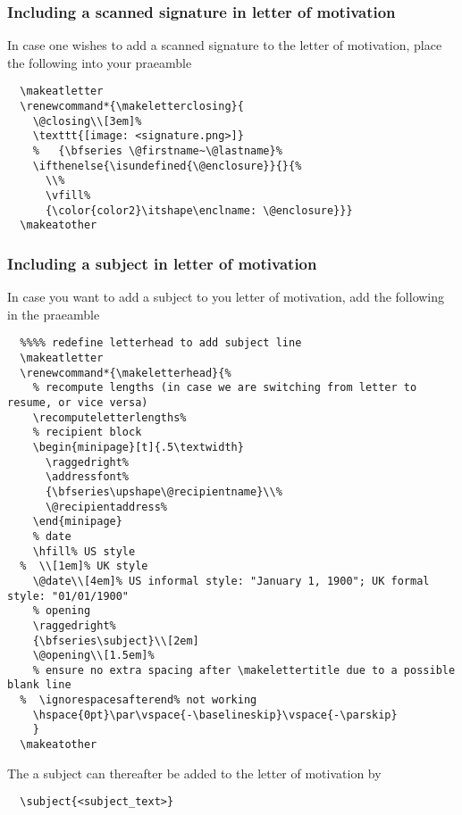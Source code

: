 \documentclass[a4paper,11pt]{article}
\begin{document}
\subsubsection{Including a scanned signature in letter of motivation}
\label{section:add:signature}
In case one wishes to add a scanned signature to the letter of motivation, place the following into your praeamble
\begin{lstlisting}
  \makeatletter
  \renewcommand*{\makeletterclosing}{
    \@closing\\[3em]%
    \texttt{[image: <signature.png>]}
    %   {\bfseries \@firstname~\@lastname}%
    \ifthenelse{\isundefined{\@enclosure}}{}{%
      \\%
      \vfill%
      {\color{color2}\itshape\enclname: \@enclosure}}}
  \makeatother
\end{lstlisting}

\subsubsection{Including a subject in letter of motivation}
\label{section:add:subject}
In case you want to add a subject to you letter of motivation, add the following in the praeamble
\begin{lstlisting}
  %%%% redefine letterhead to add subject line
  \makeatletter
  \renewcommand*{\makeletterhead}{%
    % recompute lengths (in case we are switching from letter to resume, or vice versa)
    \recomputeletterlengths%
    % recipient block
    \begin{minipage}[t]{.5\textwidth}
      \raggedright%
      \addressfont%
      {\bfseries\upshape\@recipientname}\\%
      \@recipientaddress%
    \end{minipage}
    % date
    \hfill% US style
  %  \\[1em]% UK style
    \@date\\[4em]% US informal style: "January 1, 1900"; UK formal style: "01/01/1900"
    % opening
    \raggedright%
    {\bfseries\subject}\\[2em]
    \@opening\\[1.5em]%
    % ensure no extra spacing after \makelettertitle due to a possible blank line
  %  \ignorespacesafterend% not working
    \hspace{0pt}\par\vspace{-\baselineskip}\vspace{-\parskip}
    }
  \makeatother
\end{lstlisting}
The a subject can thereafter be added to the letter of motivation by 
\begin{lstlisting}
  \subject{<subject_text>}
\end{lstlisting}
\end{document}
